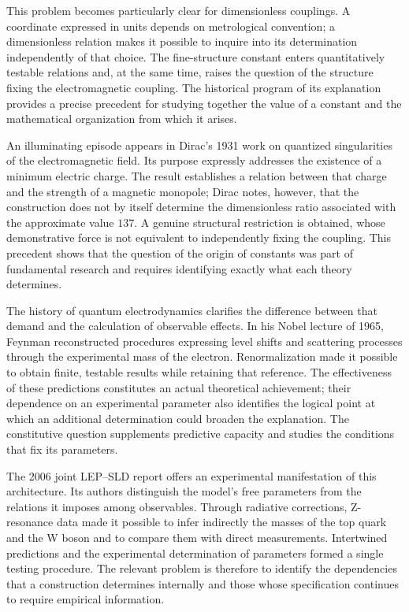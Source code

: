 This problem becomes particularly clear for dimensionless couplings.
A coordinate expressed in units depends on metrological convention;
a dimensionless relation makes it possible to inquire into its determination
independently of that choice. The fine-structure constant enters
quantitatively testable relations and, at the same time, raises the question
of the structure fixing the electromagnetic coupling. The historical
program of its explanation provides a precise precedent for
studying together the value of a constant and the mathematical
organization from which it arises.

An illuminating episode appears in Dirac's 1931 work on
quantized singularities of the electromagnetic field. Its purpose
expressly addresses the existence of a minimum electric charge. The
result establishes a relation between that charge and the strength of a
magnetic monopole; Dirac notes, however, that the construction does not
by itself determine the dimensionless ratio associated with the approximate
value \(137\)\cite{dirac1931}. A genuine structural restriction is obtained,
whose demonstrative force is not equivalent to independently fixing
the coupling. This precedent shows that the question of the origin
of constants was part of fundamental research and requires
identifying exactly what each theory determines.

The history of quantum electrodynamics clarifies the difference between
that demand and the calculation of observable effects. In his Nobel lecture
of 1965, Feynman reconstructed procedures expressing level
shifts and scattering processes through the experimental mass of the
electron\cite{feynman1965}. Renormalization made it possible to obtain
finite, testable results while retaining that reference. The effectiveness
of these predictions constitutes an actual theoretical achievement; their dependence
on an experimental parameter also identifies the logical point at
which an additional determination could broaden the explanation. The
constitutive question supplements predictive capacity and studies the
conditions that fix its parameters.

The 2006 joint LEP--SLD report offers an experimental manifestation
of this architecture\cite{lep2006}. Its authors distinguish the model's
free parameters from the relations it imposes among observables.
Through radiative corrections, Z-resonance data made it possible
to infer indirectly the masses of the top quark and the W boson and to compare them
with direct measurements. Intertwined predictions and the experimental
determination of parameters formed a single testing procedure.
The relevant problem is therefore to identify the dependencies that a
construction determines internally and those whose specification continues
to require empirical information.

